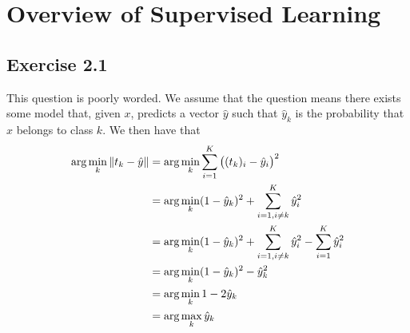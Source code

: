\section{Overview of Supervised Learning}

\subsection{Exercise 2.1}
This question is poorly worded. We assume that the question means there exists some model that, given $x$,
predicts a vector $\hat{y}$ such that $\hat{y}_k$ is the probability that $x$ belongs to class $k$. We then
have that
\begin{align*}
        \text{arg}\min_k \norm{t_k - \hat{y}} &= \text{arg}\min_k \sum_{i = 1}^K \big((t_k)_i - \hat{y}_i\big)^2 \\
                                    &= \text{arg}\min_k (1 - \hat{y}_k)^2 + \sum_{i = 1, i \neq k}^K \hat{y}_i^2 \\
                                    &= \text{arg}\min_k (1 - \hat{y}_k)^2 + \sum_{i = 1, i \neq k}^K \hat{y}_i^2 - \sum_{i = 1}^K \hat{y}_i^2\\
                                    &= \text{arg}\min_k (1 - \hat{y}_k)^2 - \hat{y}_k^2 \\
                                    &= \text{arg}\min_k 1 - 2\hat{y}_k \\
                                    &= \text{arg}\max_k \hat{y}_k
\end{align*}
